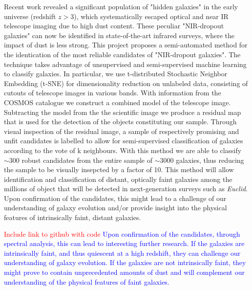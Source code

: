Recent work revealed a significant population of "hidden galaxies" in the early universe (redshift $z>3$), which systematically escaped optical and near IR telescope imaging due to high dust content. These peculiar "NIR-dropout galaxies" can now be identified in state-of-the-art infrared surveys, where the impact of dust is less strong.
This project proposes a semi-automated method for the identication of the most reliable candidates of "NIR-dropout galaxies". The technique takes advantage of unsupervised and semi-supervised machine learning to classify galaxies. In particular, we use t-distributed Stochastic Neighbor Embedding (t-SNE) for dimensionality reduction on unlabeled data, consisting of cutouts of telescope images in various bands. With information from the COSMOS catalogue we construct a combined model of the telescope image. Subtracting the model from the the scientific image we produce a residual map that is used for the detection of the objects constituting our sample. Through visual inspection of the residual image, a sample of respectively promising and unfit candidates is labelled to allow for semi-supervised classification of galaxies according to the vote of k neighbours. With this method we are able to classify $\sim300$ robust candidates from the entire sample of $\sim3000$ galaxies, thus reducing the sample to be visually insepcted by a factor of 10. This method will allow identification and classification of distant, optically faint galaxies among the millions of object that will be detected in next-generation surveys such as \textit{Euclid}. Upon confirmation of the candidates, this might lead to a challenge of our understanding of galaxy evolution and/or provide insight into the physical features of intrinsically faint, distant galaxies.

\textcolor{red}{Include link to github with code}
\textcolor{blue}{Upon confirmation of the candidates, through spectral analysis, this can lead to interesting further research. If the galaxies are intrinsically faint, and thus quiescent at a high redshift, they can challenge our understanding of galaxy evolution. If the galaxies are not intrinsically faint, they might prove to contain unprecedented amounts of dust and will complement our understanding of the physical features of faint galaxies.}
